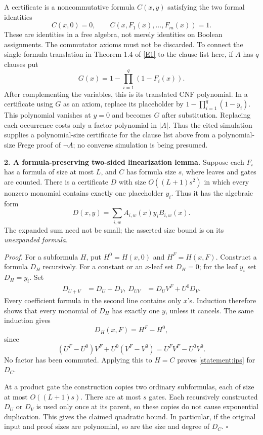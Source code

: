 \documentclass[11pt,a4paper]{article}
\newcommand{\eref}[2]{\hyperlink{extra:#1:#2}{[E#2]}}
\numberwithin{equation}{section}
\begin{document}
A certificate is a noncommutative formula $C(x,y)$ satisfying the two formal
identities
\begin{equation}\label{statement:ips}
 C(x,0)=0,\qquad C(x,F_1(x),\ldots,F_m(x))=1.
\end{equation}
These are identities in a free algebra, not merely identities on Boolean
assignments. The commutator axioms must not be discarded. To connect the
single-formula translation in Theorem 1.4 of \eref{statement}{1} to the clause
list here, if $A$ has $q$ clauses put
\[
 G(x)=1-\prod_{i=1}^{q}(1-F_i(x)).
\]
After complementing the variables, this is its translated CNF polynomial.
In a certificate using $G$ as an axiom, replace its placeholder by
$1-\prod_{i=1}^{q}(1-y_i)$. This polynomial vanishes at $y=0$ and becomes
$G$ after substitution. Replacing each occurrence costs only a factor
polynomial in $|A|$. Thus the cited simulation supplies a polynomial-size
certificate for the clause list above from a polynomial-size Frege proof
of $\neg A$; no converse simulation is being presumed.

\medskip
\textbf{2. A formula-preserving two-sided linearization lemma.}
Suppose each $F_i$ has a formula of size at most $L$, and $C$ has formula size
$s$, where leaves and gates are counted. There is a certificate $D$ with
size $O((L+1)s^2)$ in which every nonzero monomial contains exactly one
placeholder $y_i$. Thus it has the algebraic form
\begin{equation}\label{statement:two-sided}
 D(x,y)=\sum_{i,w} A_{i,w}(x)y_iB_{i,w}(x).
\end{equation}
The expanded sum need not be small; the asserted size bound is on its
\emph{unexpanded formula}.

\emph{Proof.} For a subformula $H$, put $H^0=H(x,0)$ and $H^F=H(x,F)$.
Construct a formula $D_H$ recursively. For a constant or an $x$-leaf set
$D_H=0$; for the leaf $y_i$ set $D_H=y_i$. Set
\begin{align}
 D_{U+V}&=D_U+D_V,\
 D_{UV}&=D_U V^F+U^0D_V. \label{statement:product}
\end{align}
Every coefficient formula in the second line contains only $x$'s. Induction
therefore shows that every monomial of $D_H$ has exactly one $y$, unless
it cancels. The same induction gives
\[
 D_H(x,F)=H^F-H^0,
\]
since
\[
 (U^F-U^0)V^F+U^0(V^F-V^0)=U^FV^F-U^0V^0.
\]
No factor has been commuted. Applying this to $H=C$ proves
\eqref{statement:ips} for $D_C$.

At a product gate the construction copies two ordinary subformulas, each
of size at most $O((L+1)s)$. There are at most $s$ gates. Each recursively
constructed $D_U$ or $D_V$ is used only once at its parent, so these copies
do not cause exponential duplication. This gives the claimed quadratic
bound. In particular, if the original input and proof sizes are polynomial,
so are the size and degree of $D_C$. $\square$
\end{document}
